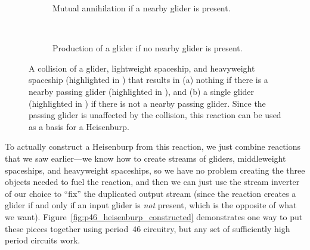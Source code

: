 \begin{figure}[!htb]
	\centering
	\begin{subfigure}{.47\textwidth}
		\centering
		\caption{Mutual annihilation if a nearby glider is present.}
		\label{fig:heisenburp_reaction_p35_0}
	\end{subfigure} \ \ \ \ %
	\begin{subfigure}{.5\textwidth}
		\centering
		\caption{Production of a glider if no nearby glider is present.}
		\label{fig:heisenburp_reaction_p35_1}
	\end{subfigure}
	\caption{A collision of a glider, lightweight spaceship, and heavyweight spaceship (highlighted in ) that results in (a) nothing if there is a nearby passing glider (highlighted in ), and (b) a single glider (highlighted in ) if there is not a nearby passing glider. Since the passing glider is unaffected by the collision, this reaction can be used as a basis for a Heisenburp.}\label{fig:heisenburp_reaction_p35}
\end{figure}

To actually construct a Heisenburp from this reaction, we just combine reactions that we saw earlier---we know how to create streams of gliders, middleweight spaceships, and heavyweight spaceships, so we have no problem creating the three objects needed to fuel the reaction, and then we can just use the stream inverter of our choice to ``fix'' the duplicated output stream (since the reaction creates a glider if and only if an input glider is \emph{not} present, which is the opposite of what we want). Figure~\ref{fig:p46_heisenburp_constructed} demonstrates one way to put these pieces together using period~$46$ circuitry, but any set of sufficiently high period circuits work.

